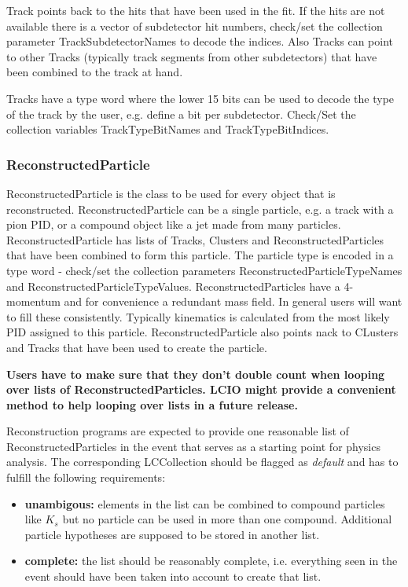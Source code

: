 \documentclass[twoside]{article}
\begin{document}
Track points back to the hits that have been used in the  fit. 
If the hits are not available there is a vector of subdetector hit numbers, check/set the collection parameter
TrackSubdetectorNames to decode the indices. Also Tracks can point to other Tracks (typically track segments from
other subdetectors) that have been combined to the track at hand.

Tracks have a type word where the lower 15 bits can be used to decode the type of the track by the
user, e.g. define a bit per subdetector. Check/Set the collection variables TrackTypeBitNames and 
TrackTypeBitIndices.

\subsubsection{ReconstructedParticle}
ReconstructedParticle is the class to be used for every object that is reconstructed. ReconstructedParticle
can be a single particle, e.g. a track with a pion PID, or a compound object like a jet made from many 
particles.
ReconstructedParticle has lists of Tracks, Clusters and ReconstructedParticles that have been combined to form 
this particle. The particle type  is encoded  in a type word - check/set the collection parameters 
ReconstructedParticleTypeNames and ReconstructedParticleTypeValues.
ReconstructedParticles have a 4-momentum and for convenience a redundant mass field. In general users will 
want to fill these consistently. Typically kinematics is calculated from the most likely PID assigned
to this particle.
ReconstructedParticle also points nack to CLusters and Tracks that have been used to create the particle.

{\bf Users have to make sure that they don't double count when looping over lists of ReconstructedParticles. 
LCIO might provide a convenient method to help looping over lists in a future release.}

Reconstruction programs are expected to provide one reasonable list of ReconstructedParticles in the event
that serves as a starting point for physics analysis. The corresponding LCCollection should be flagged 
as {\em default} and has to fulfill the following requirements:
\begin{itemize}
\item{{\bf unambigous:} elements in the list can be combined to compound particles like $K_s$ but no particle
can be used in more than one compound. Additional particle hypotheses are supposed to  be stored in another 
list.}
\item{{\bf complete:} the list should be reasonably complete, i.e. everything seen in the event should have 
been taken into account to create that list.}
\end{itemize}
\end{document}
